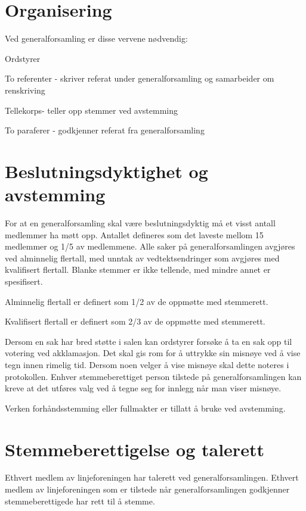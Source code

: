\section{Organisering}
\label{sec:organisering}
Ved generalforsamling er disse vervene nødvendig: 

\begin{liste}
	\item Ordstyrer
	\item To referenter - skriver referat under generalforsamling og samarbeider om \mbox{renskriving}
	\item Tellekorps\space \space \space \space - teller opp stemmer ved avstemming
	\item To paraferer - godkjenner referat fra generalforsamling
	
\end{liste}

\newpage
\section{Beslutningsdyktighet og avstemming}

For at en generalforsamling skal være beslutningsdyktig må et visst antall medlemmer ha møtt opp. Antallet defineres som det laveste mellom 15 medlemmer og 1/5 av medlemmene. Alle saker på generalforsamlingen avgjøres ved alminnelig flertall, med unntak av vedtektsendringer som avgjøres med kvalifisert flertall. Blanke stemmer er ikke tellende, med mindre annet er spesifisert. 

\begin{liste}
	\item Alminnelig flertall er definert som 1/2 av de oppmøtte med stemmerett.
	\item Kvalifisert flertall er definert som 2/3 av de oppmøtte med stemmerett.
\end{liste}

Dersom en sak har bred støtte i salen kan ordstyrer forsøke å ta en sak opp til votering ved akklamasjon. Det skal gis rom for å uttrykke sin misnøye ved å vise tegn innen rimelig tid. Dersom noen velger å vise misnøye skal dette noteres i protokollen. Enhver stemmeberettiget person tilstede på generalforsamlingen kan kreve at det utføres valg ved å tegne seg for innlegg når man viser misnøye.

Verken forhåndsstemming eller fullmakter er tillatt å bruke ved avstemming.

\section{Stemmeberettigelse og talerett}
Ethvert medlem av linjeforeningen har talerett ved generalforsamlingen.\newline
Ethvert medlem av linjeforeningen som er tilstede når generalforsamlingen godkjenner stemmeberettigede har rett til å stemme.\newline

